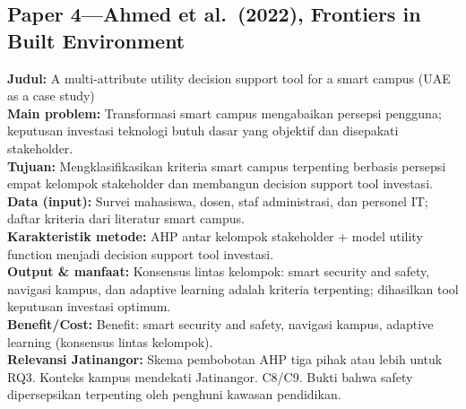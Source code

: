 \documentclass[a4paper,11pt]{article}
\begin{document}
\subsection*{Paper 4---Ahmed et al.\ (2022), Frontiers in Built Environment}
\textbf{Judul:} A multi-attribute utility decision support tool for a smart campus (UAE as a case study)\\
\textbf{Main problem:} Transformasi smart campus mengabaikan persepsi pengguna; keputusan investasi teknologi butuh dasar yang objektif dan disepakati stakeholder.\\
\textbf{Tujuan:} Mengklasifikasikan kriteria smart campus terpenting berbasis persepsi empat kelompok stakeholder dan membangun decision support tool investasi.\\
\textbf{Data (input):} Survei mahasiswa, dosen, staf administrasi, dan personel IT; daftar kriteria dari literatur smart campus.\\
\textbf{Karakteristik metode:} AHP antar kelompok stakeholder + model utility function menjadi decision support tool investasi.\\
\textbf{Output \& manfaat:} Konsensus lintas kelompok: smart security and safety, navigasi kampus, dan adaptive learning adalah kriteria terpenting; dihasilkan tool keputusan investasi optimum.\\
\textbf{Benefit/Cost:} Benefit: smart security and safety, navigasi kampus, adaptive learning (konsensus lintas kelompok).\\
\textbf{Relevansi Jatinangor:} Skema pembobotan AHP tiga pihak atau lebih untuk RQ3. Konteks kampus mendekati Jatinangor. C8/C9. Bukti bahwa safety dipersepsikan terpenting oleh penghuni kawasan pendidikan.
\end{document}
